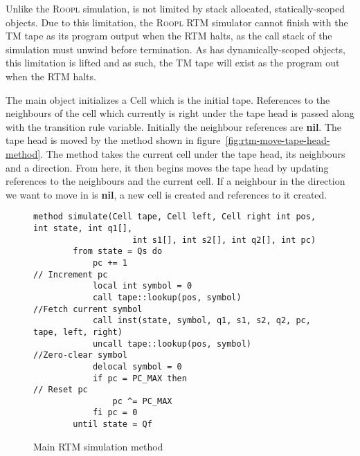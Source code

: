 Unlike the \textsc{Roopl} simulation, \rooplpp is not limited by stack allocated, statically-scoped objects. Due to this limitation, the \textsc{Roopl} RTM simulator cannot finish with the TM tape as its program output when the RTM halts, as the call stack of the simulation must unwind before termination. As \rooplpp has dynamically-scoped objects, this limitation is lifted and as such, the TM tape will exist as the program out when the RTM halts.

The main object initializes a Cell which is the initial tape. References to the neighbours of the cell which currently is right under the tape head is passed along with the transition rule variable. Initially the neighbour references are \textbf{nil}. The tape head is moved by the method shown in figure~\ref{fig:rtm-move-tape-head-method}. The method takes the current cell under the tape head, its neighbours and a direction. From here, it then begins moves the tape head by updating references to the neighbours and the current cell. If a neighbour in the direction we want to move in is \textbf{nil}, a new cell is created and references to it created. 

\begin{figure}[ht]
    \centering
    \begin{lstlisting}[style = basic, language = roopl]
    method simulate(Cell tape, Cell left, Cell right int pos, int state, int q1[], 
                    int s1[], int s2[], int q2[], int pc)
        from state = Qs do 
            pc += 1                                         // Increment pc
            local int symbol = 0
            call tape::lookup(pos, symbol)                  //Fetch current symbol
            call inst(state, symbol, q1, s1, s2, q2, pc, tape, left, right)
            uncall tape::lookup(pos, symbol)                //Zero-clear symbol    
            delocal symbol = 0
            if pc = PC_MAX then                             // Reset pc
                pc ^= PC_MAX
            fi pc = 0
        until state = Qf
    \end{lstlisting}
    \caption{Main RTM simulation method}
    \label{fig:rtm-simulation-method}
\end{figure} 

